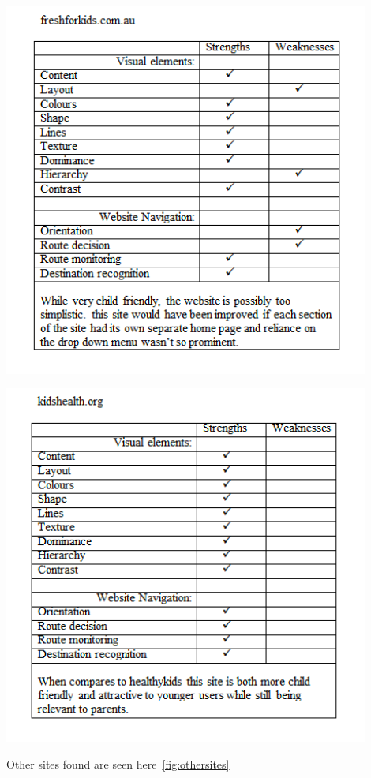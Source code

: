 \documentclass[letterpaper,12pt]{article}
\begin{document}
\includegraphics[width=0.9\textwidth]{assets/jpg/tab2}

\includegraphics[width=0.9\textwidth]{assets/jpg/tab3}

Other sites found are seen here~\cref{fig:othersites}
\end{document}

